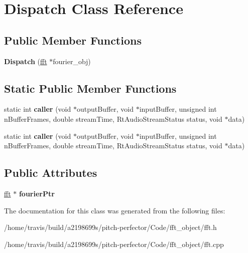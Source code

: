 \hypertarget{classDispatch}{\section{Dispatch Class Reference}
\label{classDispatch}
}
\subsection*{Public Member Functions}
\begin{DoxyCompactItemize}
\item 
\hypertarget{classDispatch_a869caace4ed05c5f70e307c707af4bc3}{{\bfseries Dispatch} (\hyperlink{classfft}{fft} $\ast$fourier\-\_\-obj)}\label{classDispatch_a869caace4ed05c5f70e307c707af4bc3}

\end{DoxyCompactItemize}
\subsection*{Static Public Member Functions}
\begin{DoxyCompactItemize}
\item 
\hypertarget{classDispatch_a53ca7df90385512d941a0b4cca324661}{static int {\bfseries caller} (void $\ast$output\-Buffer, void $\ast$input\-Buffer, unsigned int n\-Buffer\-Frames, double stream\-Time, Rt\-Audio\-Stream\-Status status, void $\ast$data)}\label{classDispatch_a53ca7df90385512d941a0b4cca324661}

\item 
\hypertarget{classDispatch_a9acbe242f4c2bb490ffb141c99616974}{static int {\bfseries caller} (void $\ast$output\-Buffer, void $\ast$input\-Buffer, unsigned int n\-Buffer\-Frames, double stream\-Time, Rt\-Audio\-Stream\-Status status, void $\ast$data)}\label{classDispatch_a9acbe242f4c2bb490ffb141c99616974}

\end{DoxyCompactItemize}
\subsection*{Public Attributes}
\begin{DoxyCompactItemize}
\item 
\hypertarget{classDispatch_ad3768fe8ace813717de415482fbfcca7}{\hyperlink{classfft}{fft} $\ast$ {\bfseries fourier\-Ptr}}\label{classDispatch_ad3768fe8ace813717de415482fbfcca7}

\end{DoxyCompactItemize}


The documentation for this class was generated from the following files\-:\begin{DoxyCompactItemize}
\item 
/home/travis/build/a2198699s/pitch-\/perfector/\-Code/fft\-\_\-object/fft.\-h\item 
/home/travis/build/a2198699s/pitch-\/perfector/\-Code/fft\-\_\-object/fft.\-cpp\end{DoxyCompactItemize}
